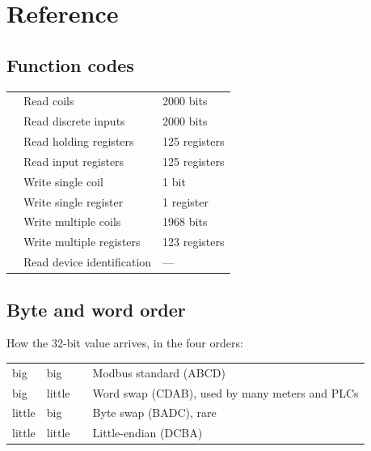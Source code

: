 \chapter{Reference}

\section{Function codes}

\begin{center}
\begin{tabularx}{\linewidth}{l L l}
  \toprule
   &  &  \\
  \midrule
   & Read coils & 2000 bits \\
   & Read discrete inputs & 2000 bits \\
   & Read holding registers & 125 registers \\
   & Read input registers & 125 registers \\
   & Write single coil & 1 bit \\
   & Write single register & 1 register \\
   & Write multiple coils & 1968 bits \\
   & Write multiple registers & 123 registers \\
   & Read device identification & --- \\
  \bottomrule
\end{tabularx}
\end{center}

\section{Byte and word order}

How the 32-bit value  arrives, in the four orders:

\begin{center}
\begin{tabularx}{\linewidth}{l l l L}
  \toprule
   &  &  &  \\
  \midrule
  big & big &  & Modbus standard (ABCD) \\
  big & little &  & Word swap (CDAB), used by many meters and PLCs \\
  little & big &  & Byte swap (BADC), rare \\
  little & little &  & Little-endian (DCBA) \\
  \bottomrule
\end{tabularx}
\end{center}

